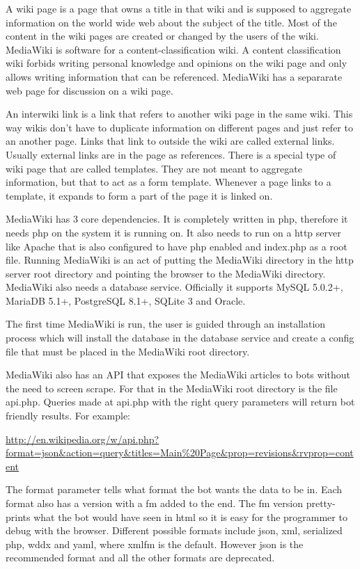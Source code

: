 A wiki page is a page that owns a title in that wiki and is supposed to
aggregate information on the world wide web about the subject of the title. Most
of the content in the wiki pages are created or changed by the users of the
wiki. MediaWiki is software for a content-classification wiki. A content
classification wiki forbids writing personal knowledge and opinions on the wiki
page and only allows writing information that can be referenced. MediaWiki has a
separarate web page for discussion on a wiki page.\cite{wiki:mediawiki-about}

An interwiki link is a link that refers to another wiki page in the same wiki. This way wikis don't have to duplicate information on different pages and just refer to an another page. Links that link to outside the wiki are called external links. Usually external links are in the page as references. There is a special type of wiki page that are called templates. They are not meant to aggregate information, but that to act as a form template. Whenever a page links to a template, it expands to form a part of the page it is linked on.

MediaWiki has 3 core dependencies. It is completely written in php, therefore it
needs php on the system it is running on. It also needs to run on a http server
like Apache that is also configured to have php enabled and index.php as a root
file. Running MediaWiki is an act of putting the MediaWiki directory in the http
server root directory and pointing the browser to the MediaWiki directory.
MediaWiki also needs a database service. Officially it supports MySQL 5.0.2+,
MariaDB 5.1+, PostgreSQL 8.1+, SQLite 3 and Oracle.\cite{wiki:mediawiki-installation-requirements}

The first time MediaWiki is run, the user is guided through an installation process which will install the database in the database service and create a config file that must be placed in the MediaWiki root directory.

MediaWiki also has an API that exposes the MediaWiki articles to bots without
the need to screen scrape. For that in the MediaWiki root directory is the file
api.php. Queries made at api.php with the right query parameters will return bot
friendly results.\cite{website:mediawiki-api} For example:

\url{http://en.wikipedia.org/w/api.php?format=json&action=query&titles=Main%20Page&prop=revisions&rvprop=content}

The format parameter tells what format the bot wants the data to be in. Each format also has a version with a fm added to the end. The fm version pretty-prints what the bot would have seen in html so it is easy for the programmer to debug with the browser. Different possible formats include json, xml, serialized php, wddx and yaml, where xmlfm is the default. However json is the recommended format and all the other formats are deprecated.

